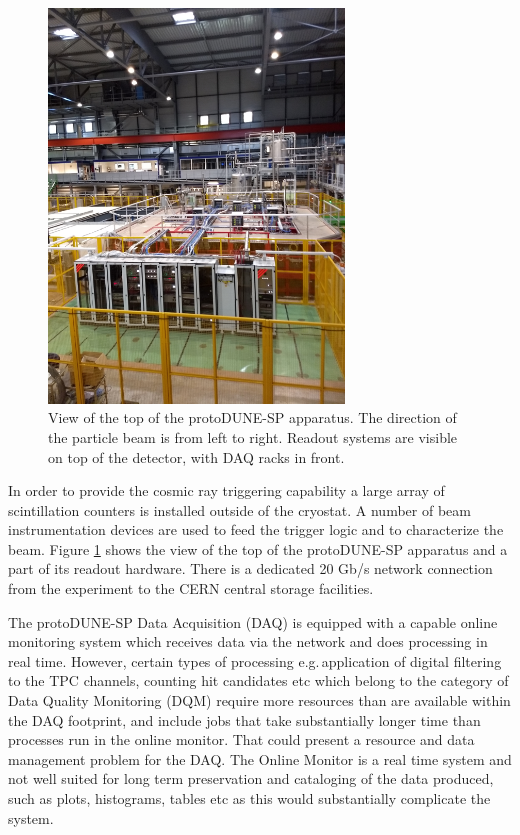 \documentclass{webofc}
\newcommand{\pd}{protoDUNE\xspace}
\begin{document}
\begin{figure}[tb]
\centering\includegraphics[width=0.7\textwidth]{figures/np04_photo_2018_v1.png}
\caption{\label{fig:np04_photo}
View of the top of the \pd-SP apparatus.
The direction of the particle beam is from left to right.
Readout systems are visible on top of the detector, with DAQ racks in front.
}
\end{figure}


In order to provide the cosmic ray triggering capability a large array of scintillation
counters is installed outside of the cryostat. A number of beam instrumentation devices
are used to feed the  trigger logic and to characterize the beam. Figure \ref{fig:np04_photo}
shows the view of the top of the \pd-SP apparatus and a part of its readout hardware.
There is a dedicated 20 Gb/s network connection from the experiment to the CERN central storage facilities.

The \pd-SP Data Acquisition (DAQ) is equipped with a capable online monitoring system
which receives data via the network and does processing in real time.
However, certain types of processing e.g.\,application of digital filtering to the TPC channels, counting hit candidates etc which belong to the
category of Data Quality Monitoring (DQM) require more resources than are available within
the DAQ footprint, and include jobs that take substantially longer time than processes run in the
online monitor. That could present a resource and data management problem for the DAQ.
The Online Monitor is a real time system
and not well suited for long term preservation and cataloging of the data produced, such as plots,
histograms, tables etc as this would substantially complicate the system.
\end{document}
